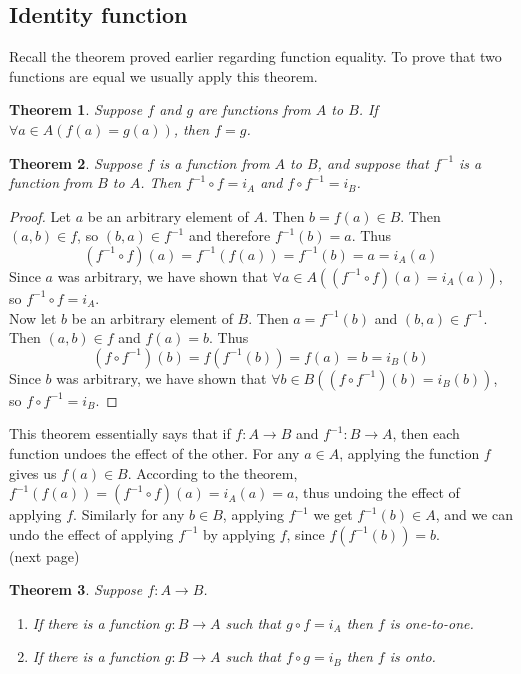 \documentclass{report}
\newtheorem*{theorem}{Theorem}
\theoremstyle{definition}
\begin{document}
\subsection{Identity function}
Recall the theorem proved earlier regarding function equality. To prove that two functions are equal we usually apply this theorem.
\begin{theorem}
Suppose $f$ and $g$ are functions from $A$ to $B$. If $\forall a\in A(f(a)=g(a))$, then $f=g$.
\end{theorem}
\begin{theorem}
Suppose $f$ is a function from $A$ to $B$, and suppose that $f^{-1}$ is a function from $B$ to $A$. Then $f^{-1}\circ f=i_A$ and $f\circ f^{-1}=i_B$.
\end{theorem}
\begin{proof}
Let $a$ be an arbitrary element of $A$. Then $b=f(a)\in B$. Then $(a,b)\in f$, so $(b,a)\in f^{-1}$ and therefore $f^{-1}(b)=a$. Thus
\begin{equation*}
(f^{-1}\circ f)(a)=f^{-1}(f(a))=f^{-1}(b)=a=i_A(a)
\end{equation*}
Since $a$ was arbitrary, we have shown that $\forall a\in A((f^{-1}\circ f)(a)=i_A(a))$, so $f^{-1}\circ f=i_A$.\\
\indent Now let $b$ be an arbitrary element of $B$. Then $a=f^{-1}(b)$ and $(b,a)\in f^{-1}$. Then $(a,b)\in f$ and $f(a)=b$. Thus
\begin{equation*}
(f\circ f^{-1})(b)=f(f^{-1}(b))=f(a)=b=i_B(b)
\end{equation*}
Since $b$ was arbitrary, we have shown that $\forall b\in B((f\circ f^{-1})(b)=i_B(b))$, so $f\circ f^{-1}=i_B$.
\end{proof}
\noindent This theorem essentially says that if $f:A\to B$ and $f^{-1}:B\to A$, then each function undoes the effect of the other.
For any $a\in A$, applying the function $f$ gives us $f(a)\in B$. According to the theorem, $f^{-1}(f(a))=(f^{-1}\circ f)(a)=i_A(a)=a$, thus undoing the effect of applying $f$.
Similarly for any $b\in B$, applying $f^{-1}$ we get $f^{-1}(b)\in A$, and we can undo the effect of applying $f^{-1}$ by applying $f$, since $f(f^{-1}(b))=b$.\\
(next page)\newpage
\begin{theorem}
Suppose $f:A\to B$.
\begin{enumerate}
\item If there is a function $g:B\to A$ such that $g\circ f=i_A$ then $f$ is one-to-one.
\item If there is a function $g:B\to A$ such that $f\circ g=i_B$ then $f$ is onto.
\end{enumerate}
\end{theorem}
\end{document}
